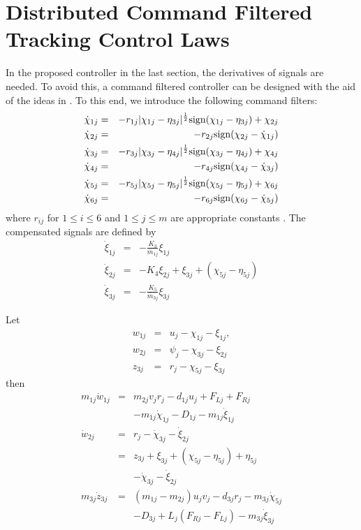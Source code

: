 \documentclass[letterpaper, 10 pt, conference]{ieeeconf}  %
\begin{document}
\section{Distributed Command Filtered Tracking Control Laws}
\label{sec4b}

In the proposed controller in the last section, the derivatives of signals are needed. To avoid this, a command filtered controller can be designed with the aid of the ideas in \cite{YU2018173,farrell09,dongCST2012}. To this end, we introduce the following command filters:
\begin{eqnarray}
\dot{\chi}_{1j}&=&-r_{1j}|\chi_{1j}-\eta_{3j}|^{\frac{1}{2}}{\rm sign}(\chi_{1j}-\eta_{3j})+\chi_{2j}\\
\dot{\chi}_{2j}&=&-r_{2j}{\rm sign}(\chi_{2j}-\dot{\chi}_{1j})\\
\dot{\chi}_{3j}&=&-r_{3j}|\chi_{3j}-\eta_{4j}|^{\frac{1}{2}}{\rm sign}(\chi_{3j}-\eta_{4j})+\chi_{4j}\\
\dot{\chi}_{4j}&=&-r_{4j}{\rm sign}(\chi_{4j}-\dot{\chi}_{3j})\\
\dot{\chi}_{5j}&=&-r_{5j}|\chi_{5j}-\eta_{5j}|^{\frac{1}{2}}{\rm sign}(\chi_{5j}-\eta_{5j})+\chi_{6j}\\
\dot{\chi}_{6j}&=&-r_{6j}{\rm sign}(\chi_{6j}-\dot{\chi}_{5j})
\end{eqnarray}
where $r_{ij}$ for $1\leq i\leq 6$ and $1\leq j\leq m$ are appropriate constants \cite{LEVANT1998379}. The compensated signals are defined by
\begin{eqnarray}
\dot{\xi}_{1j}&=&-\frac{K_3}{\bar{m}_{1j}}\xi_{1j}\\
\dot{\xi}_{2j}&=&-K_4\xi_{2j}+\xi_{3j}+(\chi_{5j}-\eta_{5j})\\
\dot{\xi}_{3j}&=&-\frac{K_5}{\bar{m}_{3j}}\xi_{3j}
\end{eqnarray}

Let \begin{eqnarray}
w_{1j}&=&u_j-\chi_{1j}-\xi_{1j},\\
w_{2j}&=&\psi_j-\chi_{3j}-\xi_{2j}\\
z_{3j}&=&r_j-\chi_{5j}-\xi_{3j}
\end{eqnarray}
then
\begin{eqnarray}
m_{1j}\dot{w}_{1j}&=&m_{2j}v_jr_j-d_{1j}u_j+F_{Lj}+F_{Rj} \nonumber\\
&&-m_{1j}\dot{\chi}_{1j}-D_{1j}-m_{1j}\dot{\xi}_{1j}\label{ge35ac}\\
\dot{w}_{2j}&=&r_j-\dot{\chi}_{3j}-\dot{\xi}_{2j}\nonumber\\
&=&z_{3j}+\xi_{3j}+(\chi_{5j}-\eta_{5j})+\eta_{5j}\nonumber\\
&&-\dot{\chi}_{3j}-\dot{\xi}_{2j}\label{ge37ac}\\
m_{3j}\dot{z}_{3j}&=&(m_{1j}-m_{2j})u_jv_j-d_{3j}r_j-m_{3j}\dot{\chi}_{5j}\nonumber\\
&&-D_{3j}+L_j(F_{Rj}-F_{Lj})-m_{3j}\dot{\xi}_{3j} \label{ge37dc}
\end{eqnarray}
\end{document}
